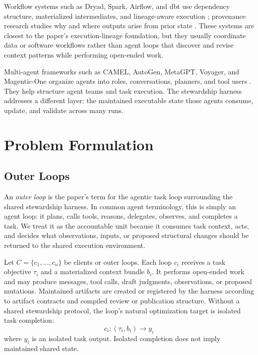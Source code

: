 \documentclass{article}
\begin{document}
Workflow systems such as Dryad, Spark, Airflow, and dbt use dependency structure, materialized intermediates, and lineage-aware execution \cite{isard2007dryad,zaharia2010spark,airflowdocs,dbtdocs}; provenance research studies why and where outputs arise from prior state \cite{buneman2001why,freire2008provenance}. These systems are closest to the paper's execution-lineage foundation, but they usually coordinate data or software workflows rather than agent loops that discover and revise context patterns while performing open-ended work.

Multi-agent frameworks such as CAMEL, AutoGen, MetaGPT, Voyager, and Magentic-One organize agents into roles, conversations, planners, and tool users \cite{li2023camel,wu2023autogen,hong2023metagpt,wang2023voyager,fourney2024magenticone}. They help structure agent teams and task execution. The stewardship harness addresses a different layer: the maintained executable state those agents consume, update, and validate across many runs.

\section{Problem Formulation}

\subsection{Outer Loops}

An \emph{outer loop} is the paper's term for the agentic task loop surrounding the shared stewardship harness. In common agent terminology, this is simply an agent loop: it plans, calls tools, reasons, delegates, observes, and completes a task. We treat it as the accountable unit because it consumes task context, acts, and decides what observations, inputs, or proposed structural changes should be returned to the shared execution environment.

Let $C=\{c_1,\ldots,c_n\}$ be clients or outer loops. Each loop $c_i$ receives a task objective $\tau_i$ and a materialized context bundle $b_i$. It performs open-ended work and may produce messages, tool calls, draft judgments, observations, or proposed mutations. Maintained artifacts are created or registered by the harness according to artifact contracts and compiled review or publication structure. Without a shared stewardship protocol, the loop's natural optimization target is isolated task completion:
\begin{equation}
c_i: (\tau_i, b_i) \rightarrow y_i
\end{equation}
where $y_i$ is an isolated task output. Isolated completion does not imply maintained shared state.
\end{document}
